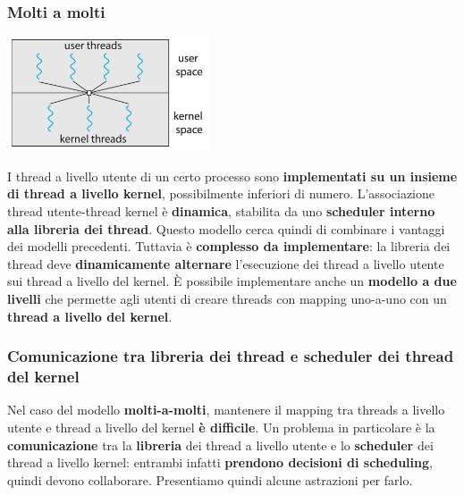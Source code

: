 \documentclass[12pt]{article}
\begin{document}
\subsubsection{Molti a molti}
\begin{center}
    \includegraphics[width = 0.45\textwidth]{Images/64.PNG}
\end{center}
I thread a livello utente di un certo processo sono \textbf{implementati su un insieme di thread a livello kernel}, possibilmente inferiori di numero. L'associazione thread utente-thread kernel è \textbf{dinamica}, stabilita da uno \textbf{scheduler interno alla libreria dei thread}. Questo modello cerca quindi di combinare i vantaggi dei modelli precedenti. Tuttavia è \textbf{complesso da implementare}: la libreria dei thread deve \textbf{dinamicamente alternare} l'esecuzione dei thread a livello utente sui thread a livello del kernel. È possibile implementare anche un \textbf{modello a due livelli} che permette agli utenti di creare threads con mapping uno-a-uno con un \textbf{thread a livello del kernel}.
\subsubsection{Comunicazione tra libreria dei thread e scheduler dei thread del kernel}
Nel caso del modello \textbf{molti-a-molti}, mantenere il mapping tra threads a livello utente e thread a livello del kernel \textbf{è difficile}. Un problema in particolare è la \textbf{comunicazione} tra la \textbf{libreria} dei thread a livello utente e lo \textbf{scheduler} dei thread a livello kernel: entrambi infatti \textbf{prendono decisioni di scheduling}, quindi devono collaborare. Presentiamo quindi alcune astrazioni per farlo.
\end{document}
